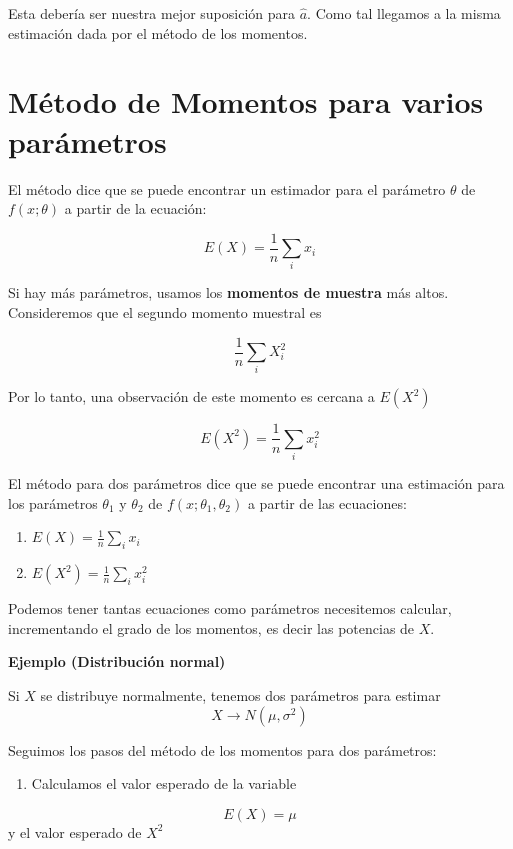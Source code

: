 \documentclass[
]{book}
\providecommand{\tightlist}{%
  \setlength{\itemsep}{0pt}\setlength{\parskip}{0pt}}
\begin{document}
Esta debería ser nuestra mejor suposición para \(\hat{a}\). Como tal llegamos a la misma estimación dada por el método de los momentos.

\hypertarget{muxe9todo-de-momentos-para-varios-paruxe1metros}{%
\section{Método de Momentos para varios parámetros}\label{muxe9todo-de-momentos-para-varios-paruxe1metros}}

El método dice que se puede encontrar un estimador para el parámetro \(\theta\) de \(f(x;\theta)\) a partir de la ecuación:

\[E(X)=\frac{1}{n}\sum_i x_i\]

Si hay más parámetros, usamos los \textbf{momentos de muestra} más altos. Consideremos que el segundo momento muestral es

\[\frac{1}{n}\sum_i X^2_i\]

Por lo tanto, una observación de este momento es cercana a \(E(X^2)\)

\[E(X ^ 2)=\frac{1}{n}\sum_i x^2_i\]

El método para dos parámetros dice que se puede encontrar una estimación para los parámetros \(\theta_1\) y \(\theta_2\) de \(f(x;\theta_1,\theta_2)\) a partir de las ecuaciones:

\begin{enumerate}
\def\labelenumi{\alph{enumi}.}
\item
  \(E(X)= \frac{1}{n}\sum_i x_i\)
\item
  \(E(X^2)=\frac{1}{n}\sum_i x^2_i\)
\end{enumerate}

Podemos tener tantas ecuaciones como parámetros necesitemos calcular, incrementando el grado de los momentos, es decir las potencias de \(X\).

\textbf{Ejemplo (Distribución normal)}

Si \(X\) se distribuye normalmente, tenemos dos parámetros para estimar
\[X \rightarrow N(\mu, \sigma^2)\]

Seguimos los pasos del método de los momentos para dos parámetros:

\begin{enumerate}
\def\labelenumi{\arabic{enumi}.}
\tightlist
\item
  Calculamos el valor esperado de la variable
\end{enumerate}

\[E(X)=\mu\]
y el valor esperado de \(X^2\)
\end{document}
